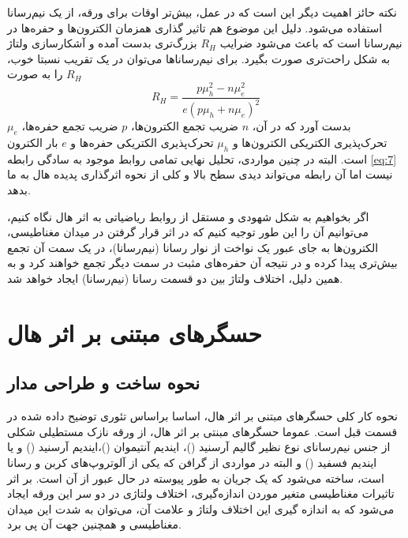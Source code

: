 \documentclass[conference]{IEEEtran-ModifiedForMVIP}
\begin{document}
نکته حائز اهمیت دیگر این است که  در عمل، بیش‌تر اوقات برای ورقه، از یک نیم‌رسانا استفاده می‌شود. دلیل این موضوع هم تاثیر گذاری همزمان الکترون‌ها و حفره‌ها در نیم‌رسانا است که باعث می‌شود ضرایب $R_H$ بزرگ‌تری بدست آمده و آشکارسازی ولتاژ به شکل راحت‌تری صورت بگیرد. برای نیم‌رسانا‌ها می‌توان در یک تقریب نسبتا خوب، $R_H$ را به صورت
\begin{equation}
	R_H = \frac{p \mu_h^2 - n \mu_e^2}{e(p\mu_h + n \mu_e)^2}
\end{equation}
بدست آورد که در آن، $n$ ضریب تجمع الکترون‌ها، $p$ ضریب تجمع حفره‌ها، $\mu_e$ تحرک‌پذیری الکتریکی الکترون‌ها و $\mu_h$ تحرک‌پذیری الکتریکی حفره‌ها و $e$ بار الکترون است. البته در چنین مواردی، تحلیل نهایی تمامی روابط موجود به سادگی رابطه \eqref{eq:7} نیست اما آن رابطه می‌تواند دیدی سطح بالا و کلی از نحوه اثرگذاری پدیده هال به ما بدهد.
\cite{noauthor_hall_2021}


اگر بخواهیم به شکل  شهودی و مستقل از روابط ریاضیاتی به اثر هال نگاه کنیم، می‌توانیم آن را این طور توجیه کنیم که در اثر قرار گرفتن در میدان مغناطیسی، الکترون‌ها به جای عبور یک نواخت از نوار رسانا (نیم‌رسانا)، در یک سمت آن تجمع بیش‌تری پیدا کرده و در نتیجه آن حفره‌های مثبت در سمت دیگر تجمع خواهند کرد و به همین دلیل، اختلاف ولتاژ بین دو قسمت رسانا (نیم‌رسانا) ایجاد خواهد شد.


\section{حسگر‌های مبتنی بر اثر هال}
\subsection{نحوه ساخت و طراحی مدار}
 
 نحوه کار کلی حسگر‌های مبتنی بر اثر هال، اساسا براساس تئوری توضیح داده شده در قسمت قبل است. عموما حسگرهای مبنتی بر اثر هال، از ورقه نازک مستطیلی شکلی از جنس نیم‌رسانای نوع  نظیر گالیم آرسنید ()، ایندیم آنتیموان ()،ایندیم آرسنید () و یا ایندیم فسفید  () و البته در مواردی از گرافن که یکی از آلوتروپ‌های کربن و رسانا است، ساخته می‌شود که یک جریان به طور پیوسته در حال عبور از آن است. بر اثر تاثیرات مغناطیسی متغیر موردن اندازه‌گیری، اختلاف ولتاژی در دو سر این ورقه ایجاد می‌شود که به اندازه گیری این اختلاف ولتاژ و علامت آن، می‌توان به شدت این میدان مغناطیسی و همچنین جهت آن پی برد.
 \cite{wiki_sensor}
 
\end{document}
